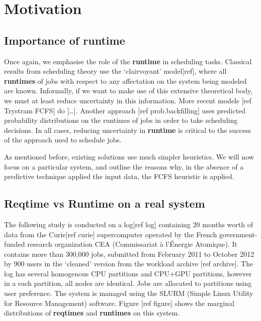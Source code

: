 \documentclass{article}
\begin{document}
\section{Motivation}

\subsection{Importance of \textbf{runtime}}
\label{sub:importance_of_runtime}
Once again, we emphasise the role of the \textbf{runtime} in scheduling tasks. Classical results from scheduling theory use the `clairvoyant' model[ref], where all \textbf{runtimes} of jobs with respect to any affectation on the system being modeled are known.
Informally, if we want to make use of this extensive theoretical body, we must at least reduce uncertainty in this information.
More recent models [ref Trystram FCFS] do [\ldots].
Another approach [ref prob.backfilling] uses predicted probability distributions on the runtimes of jobs in order to take scheduling decisions.
In all cases, reducing uncertainty in \textbf{runtime} is critical to the success of the approach used to schedule jobs.

As mentioned before, existing solutions use much simpler heuristics. We will now focus on a particular system, and outline the reasons why, in the absence of a predictive technique applied the input data, the FCFS heuristic is applied.

\subsection{Reqtime vs Runtime on a real system}
\label{sub:reqtime_vs_runtime_on_a_real_system}
The following study is conducted on a log[ref log] containing 20 months worth of data from the Curie[ref curie] supercomputer operated by the French government-funded research organization CEA (Commissariat à l'Énergie Atomique). It contains more than 300,000 jobs, submitted from February 2011 to October 2012 by 900 users in the `cleaned' version from the workload archive [ref archive]. The log has several homogenous CPU partitions and CPU+GPU partitions, however in a each partition, all nodes are identical. Jobs are allocated to partitions using user preference. The system is managed using the SLURM (Simple Linux Utility for Resource Management) software.
Figure [ref figure] shows the marginal distributions of \textbf{reqtimes} and \textbf{runtimes} on this system.
\end{document}
